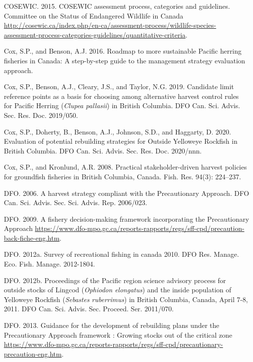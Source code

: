 \documentclass[11pt]{book}
\begin{document}
\leavevmode\hypertarget{ref-cosewic2015}{}%
COSEWIC. 2015. COSEWIC assessment process, categories and guidelines. Committee on the Status of Endangered Wildlife in Canada \url{http://cosewic.ca/index.php/en-ca/assessment-process/wildlife-species-assessment-process-categories-guidelines/quantitative-criteria}.

\leavevmode\hypertarget{ref-cox2016}{}%
Cox, S.P., and Benson, A.J. 2016. Roadmap to more sustainable Pacific herring fisheries in Canada: A step-by-step guide to the management strategy evaluation approach.

\leavevmode\hypertarget{ref-cox2019}{}%
Cox, S.P., Benson, A.J., Cleary, J.S., and Taylor, N.G. 2019. Candidate limit reference points as a basis for choosing among alternative harvest control rules for Pacific Herring (\emph{Clupea pallasii}) in British Columbia. DFO Can. Sci. Advis. Sec. Res. Doc. 2019/050.

\leavevmode\hypertarget{ref-cox2020}{}%
Cox, S.P., Doherty, B., Benson, A.J., Johnson, S.D., and Haggarty, D. 2020. Evaluation of potential rebuilding strategies for Outside Yelloweye Rockfish in British Columbia. DFO Can. Sci. Advis. Sec. Res. Doc. 2020/nnn.

\leavevmode\hypertarget{ref-cox2008a}{}%
Cox, S.P., and Kronlund, A.R. 2008. Practical stakeholder-driven harvest policies for groundfish fisheries in British Columbia, Canada. Fish. Res. 94(3): 224--237.

\leavevmode\hypertarget{ref-dfo2006}{}%
DFO. 2006. A harvest strategy compliant with the Precautionary Approach. DFO Can. Sci. Advis. Sec. Sci. Advis. Rep. 2006/023.

\leavevmode\hypertarget{ref-dfo2009}{}%
DFO. 2009. A fishery decision-making framework incorporating the Precautionary Approach \url{https://www.dfo-mpo.gc.ca/reports-rapports/regs/sff-cpd/precaution-back-fiche-eng.htm}.

\leavevmode\hypertarget{ref-dfo2012}{}%
DFO. 2012a. Survey of recreational fishing in canada 2010. DFO Res. Manage. Eco. Fish. Manage. 2012-1804.

\leavevmode\hypertarget{ref-dfo2012b}{}%
DFO. 2012b. Proceedings of the Pacific region science advisory process for outside stocks of Lingcod (\emph{Ophiodon elongatus}) and the inside population of Yelloweye Rockfish (\emph{Sebastes ruberrimus}) in British Columbia, Canada, April 7-8, 2011. DFO Can. Sci. Advis. Sec. Proceed. Ser. 2011/070.

\leavevmode\hypertarget{ref-dfo2013}{}%
DFO. 2013. Guidance for the development of rebuilding plans under the Precautionary Approach framework : Growing stocks out of the critical zone \url{https://www.dfo-mpo.gc.ca/reports-rapports/regs/sff-cpd/precautionary-precaution-eng.htm}.
\end{document}

